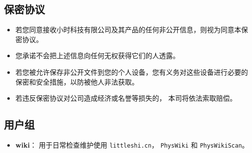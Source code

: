
\subsection{保密协议}
\begin{itemize}
\item 若您同意接收小时科技有限公司及其产品的任何非公开信息，则视为同意本保密协议。
\item 您承诺不会把上述信息向任何无权获得它们的人透露。
\item 若您被允许保存非公开文件到您的个人设备，您有义务对这些设备进行必要的保密和安全措施，以防被他人非法获取。
\item 若违反保密协议对公司造成经济或名誉等损失的， 本司将依法索取赔偿。
\end{itemize}

\subsection{用户组}
\begin{itemize}
\item \textbf{wiki}： 用于日常检查维护使用 \verb|littleshi.cn|， \verb|PhysWiki| 和 \verb|PhysWikiScan|。
\end{itemize}

